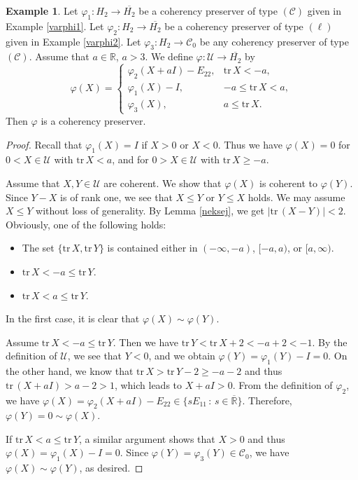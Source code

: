 \documentclass[10pt]{amsart}
\theoremstyle{definition}
\newtheorem{example}[theorem]{Example}
\theoremstyle{remark}
\numberwithin{subsection}{section}
\numberwithin{equation}{section}
\newcommand\oH{{\overline{H_2}}}
\newcommand\oR{{\overline{\mathbb{R}}}}
\begin{document}
\begin{example}
Let $\varphi_1 \colon H_2 \to \oH$ be a coherency preserver of type $(\mathcal{C})$ given in Example \ref{varphi1}. 
Let $\varphi_2 \colon H_2 \to \oH$ be a coherency preserver of type $(\ell)$ given in Example \ref{varphi2}. 
Let $\varphi_3 \colon H_2\to \mathcal{C}_0$ be any coherency preserver of type $(\mathcal{C})$. 
Assume that $a \in \mathbb{R}$, $a > 3$.
We define $\varphi\colon \mathcal{U}\to \oH$ by
\[
\varphi(X) =\begin{cases}\varphi_2(X+aI)-E_{22},& \mathrm{tr}\, X<-a,\\ \varphi_1(X)-I, & -a\leq \mathrm{tr}\, X<a,\\\varphi_3(X), & a\leq \mathrm{tr}\, X .\end{cases}
\]
Then $\varphi$ is a coherency preserver. 
\end{example}
\begin{proof}
Recall that $\varphi_1(X)=I$ if $X>0$ or $X<0$. 
Thus we have $\varphi(X)=0$ for $0< X\in \mathcal{U}$ with $\mathrm{tr}\,X< a$, and for $0>X\in \mathcal{U}$ with $\mathrm{tr}\,X \geq -a$. 

Assume that $X, Y\in \mathcal{U}$ are coherent. 
We show that $\varphi(X)$ is coherent to $\varphi(Y)$.
Since $Y-X$ is of rank one, we see that $X\leq Y$ or $Y\leq X$ holds. 
We may assume $X\leq Y$ without loss of generality. 
By Lemma \ref{neksej}, we get $|\mathrm{tr}\,(X-Y)|<2$. 
Obviously, one of the following holds: 
\begin{itemize}
\item The set $\{\mathrm{tr}\,X, \mathrm{tr}\,Y\}$ is contained either in $(-\infty, -a)$,  $[-a, a)$, or  $[a,\infty)$. 
\item $\mathrm{tr}\,X<-a\leq \mathrm{tr}\,Y$.
\item $\mathrm{tr}\,X<a\leq \mathrm{tr}\,Y$.
\end{itemize}

In the first case, it is clear that $\varphi(X)\sim \varphi(Y)$. 

Assume $\mathrm{tr}\,X<-a\leq \mathrm{tr}\,Y$. Then we have  $\mathrm{tr}\,Y < \mathrm{tr}\,X + 2 <-a+2<-1$. By the definition of $\mathcal{U}$, we see that $Y<0$, and we obtain $\varphi(Y)=\varphi_1(Y)-I =0$. 
On the other hand, we know that $\mathrm{tr}\,X> \mathrm{tr}\,Y -2 \ge -a-2$ and thus $\mathrm{tr}\,(X+aI)>a-2>1$, which leads to $X+aI>0$. From the definition of $\varphi_2$, we have $\varphi(X)=\varphi_2(X+aI)-E_{22}\in \{sE_{11}\,:\, s\in {\oR}\}$. Therefore, $\varphi(Y)=0\sim \varphi(X)$. 

If $\mathrm{tr}\,X<a\leq \mathrm{tr}\,Y$, a similar argument shows that $X>0$ and thus $\varphi(X)=\varphi_1(X)-I=0$. Since $\varphi(Y)=\varphi_3(Y)\in\mathcal{C}_0$, we have $\varphi(X)\sim\varphi(Y)$, as desired. 
\end{proof}
\end{document}

